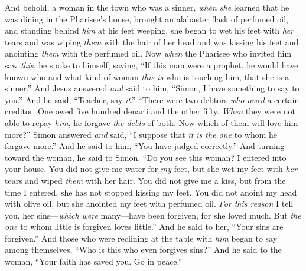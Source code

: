 \begin{biblechapter}
\verse And behold, a woman in the town who was a sinner, \textit{when she} learned that he was dining in the Pharisee’s house, brought an alabaster flask of perfumed oil,
\verse and standing behind \textit{him} at his feet weeping, she began to wet his feet with \textit{her} tears and was wiping \textit{them} with the hair of her head and was kissing his feet and anointing \textit{them} with the perfumed oil.
\verse Now \textit{when} the Pharisee who invited him saw \textit{this}, he spoke to himself, saying, “If this man were a prophet, he would have known who and what kind of woman \textit{this is} who is touching him, that she is a sinner.”
\verse And Jesus answered \textit{and} said to him, “Simon, I have something to say to you.” And he said, “Teacher, say \textit{it}.”
\verse “There were two debtors \textit{who owed} a certain creditor. One owed five hundred denarii and the other fifty.
\verse \textit{When} they were not able to repay \textit{him}, he forgave \textit{the debts} of both. Now which of them will love him more?”
\verse Simon answered \textit{and} said, “I suppose that \textit{it is the one} to whom he forgave more.” And he said to him, “You have judged correctly.”
\verse And turning toward the woman, he said to Simon, “Do you see this woman? I entered into your house. You did not give me water for \textit{my} feet, but she wet my feet with \textit{her} tears and wiped \textit{them} with her hair.
\verse You did not give me a kiss, but from the time I entered, she has not stopped kissing my feet.
\verse You did not anoint my head with olive oil, but she anointed my feet with perfumed oil.
\verse \textit{For this reason} I tell you, her sins—\textit{which were} many—have been forgiven, for she loved much. But \textit{the one} to whom little is forgiven loves little.”
\verse And he said to her, “Your sins are forgiven.”
\verse And those who were reclining at the table with \textit{him} began to say among themselves, “Who is this who even forgives sins?”
\verse And he said to the woman, “Your faith has saved you. Go in peace.”
\end{biblechapter}

